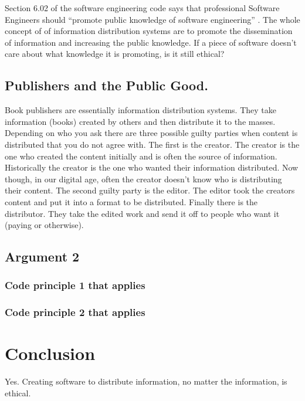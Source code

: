 \documentclass[11pt]{article}
\begin{document}
Section 6.02 of the software engineering code says that professional Software Engineers should ``promote public knowledge of software engineering'' \cite[6.02]{secode}. The whole concept of of information distribution systems are to promote the dissemination of information and increasing the public knowledge. If a piece of software doesn't care about what knowledge it is promoting, is it still ethical?

\subsection{Publishers and the Public Good.}

Book publishers are essentially information distribution systems. They take information (books) created by others and then distribute it to the masses. Depending on who you ask there are three possible guilty parties when content is distributed that you do not agree with. The first is the creator. The creator is the one who created the content initially and is often the source of information. Historically the creator is the one who wanted their information distributed. Now though, in our digital age, often the creator doesn't know who is distributing their content. The second guilty party is the editor. The editor took the creators content and put it into a format to be distributed. Finally there is the distributor. They take the edited work and send it off to people who want it (paying or otherwise).

\subsection{Argument 2}
\subsubsection{Code principle 1 that applies}
\subsubsection{Code principle 2 that applies}

\section{Conclusion}
Yes. Creating software to distribute information, no matter the information, is ethical.

\newpage


\end{document}
